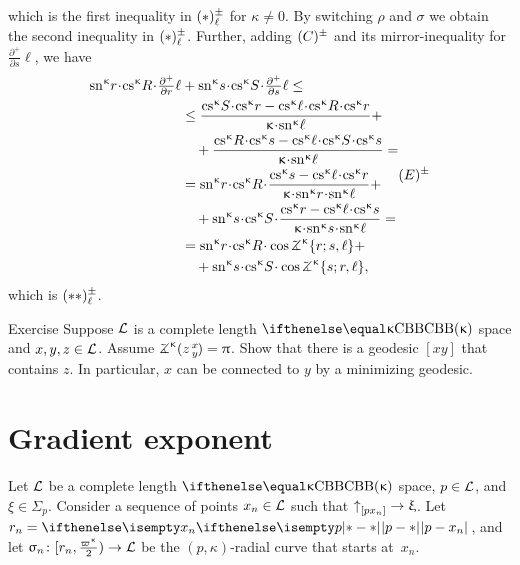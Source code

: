 which is the first inequality in $(*)^{\pm}_\ell$ for $\kappa\ne 0$.
By switching $\rho$ and $\sigma$ we obtain the second inequality in $(*)^{\pm}_\ell$.
Further, adding $(C)^{\pm}$ and its mirror-inequality for $\tfrac{\partial^+}{\partial s}\ell$, we have
\[\begin{aligned}
\sn\kappa r\cdot\cs\kappa R\cdot\tfrac{\partial^+}{\partial r}\ell
&+
\sn\kappa s\cdot\cs\kappa S\cdot\tfrac{\partial^+}{\partial s}\ell\le
\\
&\le
\frac
{{\cs\kappa S}\cdot\cs\kappa r-\cs\kappa\ell\cdot\cs\kappa R\cdot\cs\kappa r}
{\kappa\cdot\sn\kappa\ell}
+\\
&\quad +
\frac
{{\cs\kappa R}\cdot\cs\kappa s-\cs\kappa\ell\cdot\cs\kappa S\cdot\cs\kappa s}
{\kappa\cdot\sn\kappa\ell}=
\\
&=
\sn\kappa r\cdot\cs\kappa R\cdot
\frac
{\cs\kappa s-\cs\kappa\ell\cdot\cs\kappa r}
{\kappa\cdot\sn\kappa r\cdot\sn\kappa\ell}
+\\
&\quad +
\sn\kappa s\cdot\cs\kappa S\cdot
\frac
{\cs\kappa r-\cs\kappa\ell\cdot\cs\kappa s}
{\kappa\cdot\sn\kappa s\cdot\sn\kappa\ell}
=
\\
&=\sn\kappa r\cdot\cs\kappa R\cdot\cos\tangle\mc\kappa\{r;s,\ell\}
+\\
&\quad +\sn\kappa s\cdot\cs\kappa S\cdot\cos\tangle\mc\kappa\{s;r,\ell\},
\end{aligned}
\leqno(E)\mc\pm\]
which is $(**)^{\pm}_\ell$.\qeds


\begin{thm}{Exercise}\label{ex:geodesic}
Suppose $\mathcal{L}$ is a complete length $\Alex\kappa$ space 
and $x,y,z\in \spc{L}$.
Assume $\angk\kappa zxy=\pi$.
Show that there is a geodesic $[xy]$
that contains $z$.
In particular, $x$ can be connected to $y$ by a minimizing geodesic.
\end{thm}





\section{Gradient exponent}\label{sec:gexp}

Let $\mathcal{L}$ be a complete length $\Alex{\kappa}$ space, 
$p\in \spc{L}$, 
and $\xi\in \Sigma_p$.
Consider a sequence of points $x_n\in \spc{L}$ such that $\dir p{x_n}\to \xi$.
Let $r_n=\dist{p}{x_n}{}$, and let
$\sigma_n\:[r_n,\tfrac{\varpi\kappa}2)\to \spc{L}$ be the $(p,\kappa)$-radial curve that starts at~$x_n$.

